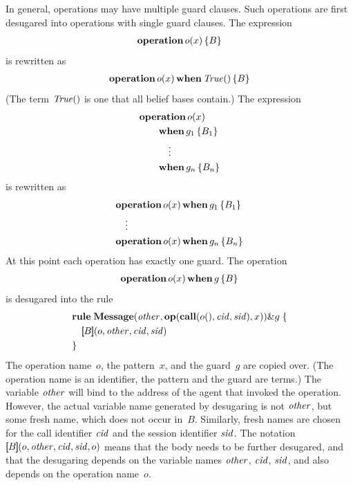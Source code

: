 \documentclass[a4paper,12pt,oneside,fleqn]{book} %
\newcommand{\eval}[1]{[\!\![#1]\!\!]}
\begin{document}
In general, operations may have multiple guard clauses. Such operations are
first desugared into operations with single guard clauses. The expression
\begin{align}
{\bf operation}\,o(x)\,\{ B \}
\end{align}
is rewritten as
\begin{align}
{\bf operation}\,o(x)\,{\bf when}\,{\it True}()\,\{ B \}
\end{align}
(The term ${\it True}()$ is one that all belief bases contain.) The
expression
\begin{align}
&{\bf operation}\,o(x) \\
&\qquad{\bf when}\,g_1\,\{ B_1 \} \\
&\qquad\quad\vdots\notag \\
&\qquad{\bf when}\,g_n\,\{ B_n \} \\
\end{align}
is rewritten as
\begin{align}
&{\bf operation}\,o(x)\,{\bf when}\,g_1\,\{ B_1 \} \\
&\quad\vdots\notag\\
&{\bf operation}\,o(x)\,{\bf when}\,g_n\,\{ B_n \}
\end{align}
At this point each operation has exactly one guard. The operation
\begin{align}
{\bf operation}\,o(x)\,{\bf when}\,g\,\{ B \}
\end{align}
is desugared into the rule
\begin{align}
\begin{aligned}
&{\bf rule}\;
  {\bf Message}
  ({\it other},
  {\bf op}({\bf call}(o(), {\it cid},{\it sid}), x))\& g \; \{ \\
&\quad \eval{B}(o, {\it other}, {\it cid}, {\it sid}) \\
&\}
\end{aligned}
\end{align}
The operation name~$o$, the pattern~$x$, and the guard~$g$ are copied over.
(The operation name is an identifier, the pattern and the guard are terms.)
The variable $\it other$ will bind to the address of the agent that invoked
the operation. However, the actual variable name generated by desugaring is
not $\it other$, but some fresh name, which does not occur in~$B$.
Similarly, fresh names are chosen for the call identifier $\it cid$ and the
session identifier $\it sid$. The notation $\eval{B}(o, {\it other}, {\it
cid}, {\it sid}, o)$ means that the body needs to be further desugared, and
that the desugaring depends on the variable names $\it other$, $\it cid$,
$\it sid$, and also depends on the operation name~$o$.
\end{document}
